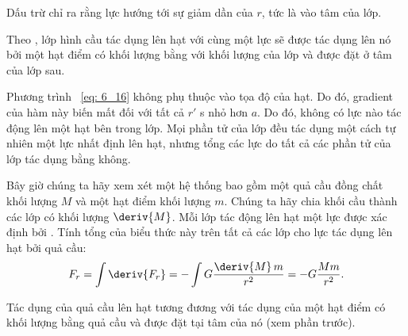 \noindent
Dấu trừ chỉ ra rằng lực hướng tới sự giảm dần của $r$, tức là vào tâm của lớp.

Theo , lớp hình cầu tác dụng lên hạt với cùng một lực sẽ được tác dụng lên nó bởi một hạt điểm có khối lượng bằng với khối lượng của lớp và được đặt ở tâm của lớp sau.


Phương trình ~\eqref{eq: 6_16} không phụ thuộc vào tọa độ của hạt. Do đó, gradient của hàm này biến mất đối với tất cả $r'$ s nhỏ hơn $a$. Do đó, không có lực nào tác động lên một hạt bên trong lớp. Mọi phần tử của lớp đều tác dụng một cách tự nhiên một lực nhất định lên hạt, nhưng tổng các lực do tất cả các phần tử của lớp tác dụng bằng không.


Bây giờ chúng ta hãy xem xét một hệ thống bao gồm một quả cầu đồng chất khối lượng $M$ và một hạt điểm khối lượng $m$. Chúng ta hãy chia khối cầu thành các lớp có khối lượng $\deriv{M}$. Mỗi lớp tác động lên hạt một lực được xác định bởi . Tính tổng của biểu thức này trên tất cả các lớp cho lực tác dụng lên hạt bởi quả cầu:
\begin{equation}\label{eq:6_18}
	F_r = \int\deriv{F_r} = -\int G\frac{\deriv{M}\,m}{r^2} = -G\frac{Mm}{r^2}.
\end{equation}

\noindent
Tác dụng của quả cầu lên hạt tương đương với tác dụng của một hạt điểm có khối lượng bằng quả cầu và được đặt tại tâm của nó (xem phần trước).

